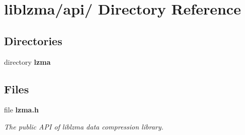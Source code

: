 \section{liblzma/api/ Directory Reference}
\label{dir_3c7592c36b11e0fd373edb6a27c72b1d}
\subsection*{Directories}
\begin{DoxyCompactItemize}
\item 
directory {\bf lzma}
\end{DoxyCompactItemize}
\subsection*{Files}
\begin{DoxyCompactItemize}
\item 
file {\bf lzma.\-h}
\begin{DoxyCompactList}\small\item\em The public A\-P\-I of liblzma data compression library. \end{DoxyCompactList}\end{DoxyCompactItemize}
